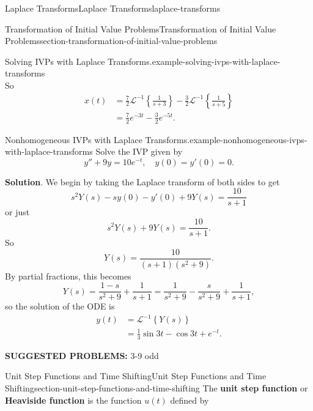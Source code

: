 \documentclass[oneside,10pt,]{book}
\newcommand{\terminology}[1]{\textbf{#1}}
\numberwithin{equation}{section}
\newcommand{\iLaplace}[1]{\mathcal{L}^{-1}\left\{#1\right\}}
\newcommand{\amp}{&}
\begin{document}
\begin{chapterptx}{Laplace Transforms}{}{Laplace Transforms}{}{}{laplace-transforms}
\begin{sectionptx}{Transformation of Initial Value Problems}{}{Transformation of Initial Value Problems}{}{}{section-transformation-of-initial-value-problems}
\begin{example}{Solving IVPs with Laplace Transforms.}{example-solving-ivps-with-laplace-transforms}
\begin{equation*}
\end{equation*}
So%
\begin{align*}
x(t) \amp= \frac{7}{2}\mathcal{L}^{-1}\left\{\frac{1}{s+3}\right\} - \frac{3}{2}\mathcal{L}^{-1}\left\{\frac{1}{s+5}\right\}\\
\amp= \frac{7}{2}e^{-3t} - \frac{3}{2}e^{-5t}\text{.}
\end{align*}
%
\end{example}
\begin{example}{Nonhomogeneous IVPs with Laplace Transforms.}{example-nonhomogeneous-ivps-with-laplace-transforms}%
\hypertarget{p-519}{}%
Solve the IVP given by%
\begin{equation*}
y''+9y = 10e^{-t},\quad y(0) = y'(0) = 0.
\end{equation*}
%
\par\smallskip%
\noindent\textbf{Solution}.\hypertarget{solution-84}{}\quad%
\hypertarget{p-520}{}%
We begin by taking the Laplace transform of both sides to get%
\begin{equation*}
s^{2}Y(s) - sy(0) - y'(0) + 9Y(s) = \frac{10}{s+1}
\end{equation*}
or just%
\begin{equation*}
s^{2}Y(s) + 9Y(s) = \frac{10}{s+1}.
\end{equation*}
So%
\begin{equation*}
Y(s) = \frac{10}{(s+1)(s^{2}+9)}.
\end{equation*}
By partial fractions, this becomes%
\begin{equation*}
Y(s) = \frac{1-s}{s^{2}+9} + \frac{1}{s+1} = \frac{1}{s^{2}+9} - \frac{s}{s^{2}+9} + \frac{1}{s+1},
\end{equation*}
so the solution of the ODE is%
\begin{align*}
y(t) \amp = \iLaplace{Y(s)}\\
\amp= \frac{1}{3}\sin3t -\cos3t + e^{-t}\text{.}
\end{align*}
%
\end{example}
\terminology{SUGGESTED PROBLEMS:} 3-9 odd\end{sectionptx}
%
%
\typeout{************************************************}
\typeout{************************************************}
%
\begin{sectionptx}{Unit Step Functions and Time Shifting}{}{Unit Step Functions and Time Shifting}{}{}{section-unit-step-functions-and-time-shifting}
\hypertarget{p-521}{}%
The \terminology{unit step function} or \terminology{Heaviside function} is the function \(u(t)\) defined by%

\end{sectionptx}
\end{chapterptx}
\end{document}
